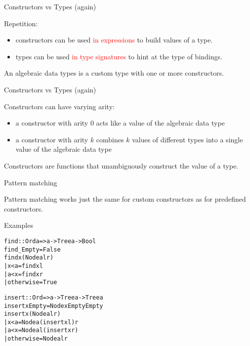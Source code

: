 \documentclass{beamer}
\begin{document}
\begin{frame}{Constructors vs Types (again)}

Repetition:
\begin{itemize}
    \item constructors can be used \textcolor{red}{in expressions} to build values of a type.
    \item types can be used \textcolor{red}{in type signatures} to hint at the type of bindings.
\end{itemize}

\pause

\begin{block}{\centering An algebraic data types is a custom type with one or more constructors.}
\end{block}

\end{frame}

\begin{frame}{Constructors vs Types (again)}

Constructors can have varying arity:\pause
\begin{itemize}
    \item a constructor with arity $0$ acts like a value of the algebraic data type\pause
    \item a constructor with arity $k$ combines $k$ values of different types into a single value of the algebraic data type
\end{itemize}

\pause

\begin{alertblock}{\centering Constructors are functions that unambiguously construct the value of a type.}
\end{alertblock}

\end{frame}

\begin{frame}[fragile]{Pattern matching}

Pattern matching works just the same for custom constructors as for predefined constructors.

\pause

\begin{exampleblock}{Examples}
\begin{alltt}
find :: Ord a => a -> Tree a -> Bool\pause
find _ Empty = False\pause
find x (Node a l r)\pause
  | x < a     = find x l\pause
  | a < x     = find x r\pause
  | otherwise = True

insert :: Ord => a -> Tree a -> Tree a\pause
insert x Empty = Node x Empty Empty\pause
insert x (Node a l r)\pause
  | x < a     = Node a (insert x l) r\pause
  | a < x     = Node a l (insert x r)\pause
  | otherwise = Node a l r
\end{alltt}
\end{exampleblock}

\end{frame}
\end{document}
